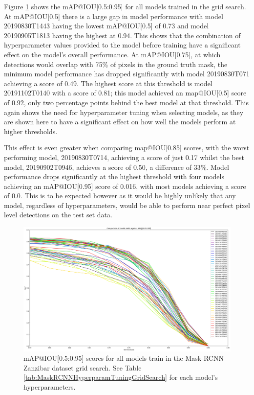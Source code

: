 Figure \ref{fig:mAP-graph} shows the mAP@IOU[0.5:0.95] for all models trained in the grid search. At mAP@IOU[0.5] there is a large gap in model performance with model 20190830T1443 having the lowest mAP@IOU[0.5] of 0.73 and model 20190905T1813 having the highest at 0.94. This shows that the combination of hyperparameter values provided to the model before training have a significant effect on the model's overall performance. At mAP@IOU[0.75], at which detections would overlap with 75\% of pixels in the ground truth mask, the minimum model performance has dropped significantly with model 20190830T071 achieving a score of 0.49. The highest score at this threshold is model 20191102T0140 with a score of 0.81; this model achieved an map@IOU[0.5] score of 0.92, only two percentage points behind the best model at that threshold. This again shows the need for hyperparameter tuning when selecting models, as they are shown here to have a significant effect on how well the models perform at higher thresholds.

This effect is even greater when comparing map@IOU[0.85] scores, with the worst performing model, 20190830T0714,  achieving a score of just 0.17 whilst the best model, 20190902T0946, achieves a score of 0.50, a difference of 33\%. Model performance drops significantly at the highest threshold with four models achieving an mAP@IOU[0.95] score of 0.016, with most models achieving a score of 0.0. This is to be expected however as it would be highly unlikely that any model, regardless of hyperparameters, would be able to perform near perfect pixel level detections on the test set data. 

\begin{figure}
	\begin{center}
		\includegraphics[scale=0.33]{Chapter3/figs/comparison_graph_all_diff_colours.png}
	\end{center}
	\caption{mAP@IOU[0.5:0.95] scores for all models train in the Mask-RCNN Zanzibar dataset grid search. See Table \ref{tab:MaskRCNNHyperparamTuningGridSearch} for each model's hyperparameters.}
	\label{fig:mAP-graph}
\end{figure}

